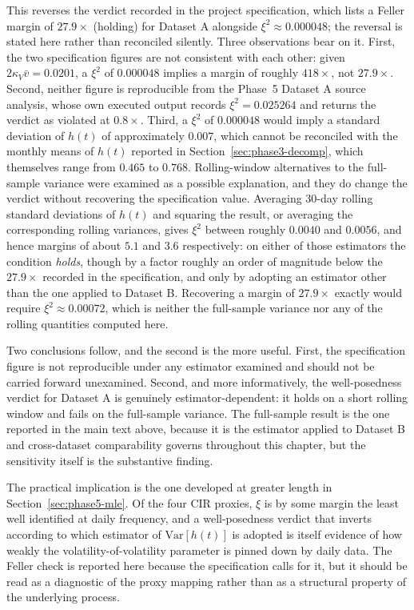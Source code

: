 \documentclass[11pt, a4paper, twoside]{article}
\begin{document}
This reverses the verdict recorded in the project specification, which lists a Feller margin of $27.9\times$ (holding) for Dataset A alongside $\xi^2 \approx 0.000048$; the reversal is stated here rather than reconciled silently. Three observations bear on it. First, the two specification figures are not consistent with each other: given $2\kappa_V\bar v = 0.0201$, a $\xi^2$ of $0.000048$ implies a margin of roughly $418\times$, not $27.9\times$. Second, neither figure is reproducible from the Phase~5 Dataset A source analysis, whose own executed output records $\xi^2 = 0.025264$ and returns the verdict as violated at $0.8\times$. Third, a $\xi^2$ of $0.000048$ would imply a standard deviation of $h(t)$ of approximately $0.007$, which cannot be reconciled with the monthly means of $h(t)$ reported in Section~\ref{sec:phase3-decomp}, which themselves range from $0.465$ to $0.768$. Rolling-window alternatives to the full-sample variance were examined as a possible explanation, and they do change the verdict without recovering the specification value. Averaging 30-day rolling standard deviations of $h(t)$ and squaring the result, or averaging the corresponding rolling variances, gives $\xi^2$ between roughly $0.0040$ and $0.0056$, and hence margins of about $5.1$ and $3.6$ respectively: on either of those estimators the condition \emph{holds}, though by a factor roughly an order of magnitude below the $27.9\times$ recorded in the specification, and only by adopting an estimator other than the one applied to Dataset B. Recovering a margin of $27.9\times$ exactly would require $\xi^2 \approx 0.00072$, which is neither the full-sample variance nor any of the rolling quantities computed here.

Two conclusions follow, and the second is the more useful. First, the specification figure is not reproducible under any estimator examined and should not be carried forward unexamined. Second, and more informatively, the well-posedness verdict for Dataset A is genuinely estimator-dependent: it holds on a short rolling window and fails on the full-sample variance. The full-sample result is the one reported in the main text above, because it is the estimator applied to Dataset B and cross-dataset comparability governs throughout this chapter, but the sensitivity itself is the substantive finding.

The practical implication is the one developed at greater length in Section~\ref{sec:phase5-mle}. Of the four CIR proxies, $\xi$ is by some margin the least well identified at daily frequency, and a well-posedness verdict that inverts according to which estimator of $\mathrm{Var}[h(t)]$ is adopted is itself evidence of how weakly the volatility-of-volatility parameter is pinned down by daily data. The Feller check is reported here because the specification calls for it, but it should be read as a diagnostic of the proxy mapping rather than as a structural property of the underlying process.
\end{document}

